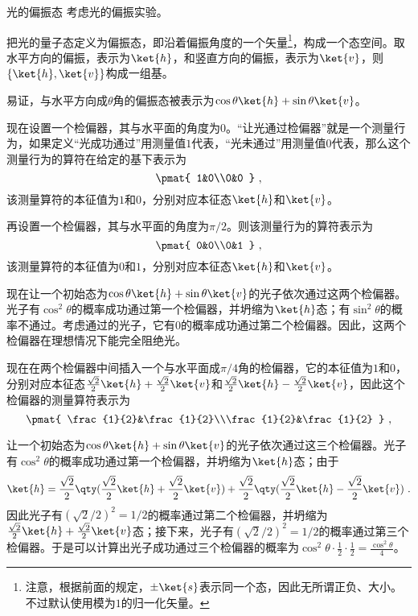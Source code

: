 \begin{example}{光的偏振态}\label{ex_QMPrcp_3}
考虑光的偏振实验。

把光的量子态定义为偏振态，即沿着偏振角度的一个矢量\footnote{注意，根据前面的规定，$\pm\ket{s}$表示同一个态，因此无所谓正负、大小。不过默认使用模为$1$的归一化矢量。}，构成一个态空间。取水平方向的偏振，表示为$\ket{h}$，和竖直方向的偏振，表示为$\ket{v}$，则$\{\ket{h}, \ket{v}\}$构成一组基。

易证，与水平方向成$\theta$角的偏振态被表示为$\cos\theta\ket{h}+\sin\theta\ket{v}$。

现在设置一个检偏器，其与水平面的角度为$0$。“让光通过检偏器”就是一个测量行为，如果定义“光成功通过”用测量值$1$代表，“光未通过”用测量值$0$代表，那么这个测量行为的算符在给定的基下表示为
\begin{equation}
\pmat{
    1&0\\0&0
}~,
\end{equation}
该测量算符的本征值为$1$和$0$，分别对应本征态$\ket{h}$和$\ket{v}$。

再设置一个检偏器，其与水平面的角度为$\pi/2$。则该测量行为的算符表示为
\begin{equation}
\pmat{
    0&0\\0&1
}~,
\end{equation}
该测量算符的本征值为$0$和$1$，分别对应本征态$\ket{h}$和$\ket{v}$。

现在让一个初始态为$\cos\theta\ket{h}+\sin\theta\ket{v}$的光子依次通过这两个检偏器。光子有$\cos^2\theta$的概率成功通过第一个检偏器，并坍缩为$\ket{h}$态；有$\sin^2\theta$的概率不通过。考虑通过的光子，它有$0$的概率成功通过第二个检偏器。因此，这两个检偏器在理想情况下能完全阻绝光。

现在在两个检偏器中间插入一个与水平面成$\pi/4$角的检偏器，它的本征值为$1$和$0$，分别对应本征态$\frac{\sqrt{2}}{2}\ket{h}+\frac{\sqrt{2}}{2}\ket{v}$和$\frac{\sqrt{2}}{2}\ket{h}-\frac{\sqrt{2}}{2}\ket{v}$，因此这个检偏器的测量算符表示为
\begin{equation}
\pmat{
    \frac{1}{2}&\frac{1}{2}\\\frac{1}{2}&\frac{1}{2}
}~,
\end{equation}

让一个初始态为$\cos\theta\ket{h}+\sin\theta\ket{v}$的光子依次通过这三个检偏器。光子有$\cos^2\theta$的概率成功通过第一个检偏器，并坍缩为$\ket{h}$态；由于
\begin{equation}
\ket{h}=\frac{\sqrt{2}}{2}\qty(\frac{\sqrt{2}}{2}\ket{h}+\frac{\sqrt{2}}{2}\ket{v})+\frac{\sqrt{2}}{2}\qty(\frac{\sqrt{2}}{2}\ket{h}-\frac{\sqrt{2}}{2}\ket{v})~.
\end{equation}
因此光子有$(\sqrt{2}/2)^2=1/2$的概率通过第二个检偏器，并坍缩为$\frac{\sqrt{2}}{2}\ket{h}+\frac{\sqrt{2}}{2}\ket{v}$态；接下来，光子有$(\sqrt{2}/2)^2=1/2$的概率通过第三个检偏器。于是可以计算出光子成功通过三个检偏器的概率为$\cos^2\theta\cdot\frac{1}{2}\cdot\frac{1}{2}=\frac{\cos^2\theta}{4}$。

\end{example}

